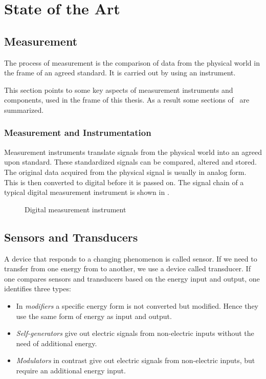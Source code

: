 \chapter{State of the Art%
  \label{chap:\currfilebase}}

\section{Measurement}
The process of measurement is the comparison of data from the physical world in the frame of an agreed standard. It is carried out by using an instrument.

This section points to some key aspects of measurement instruments and components, used in the frame of this thesis. As a result some sections of~\cite{webster2018measurement} are summarized.

\subsection{Measurement and Instrumentation}
Measurement instruments translate signals from the physical world into an agreed upon standard. These standardized signals can be compared, altered and stored.
The original data acquired from the physical signal is usually in analog form. This is then converted to digital before it is passed on. The signal chain of a typical digital measurement instrument is shown in .

\begin{figure}[!htb]
  \centering
  
  \caption[Digital Instrument]{Digital measurement instrument%
    \label{fig:digital_instrument}}
\end{figure}

\section{Sensors and Transducers}
A device that responds to a changing phenomenon is called sensor. If we need to transfer from one energy from to another, we use a device called transducer. If one compares sensors and transducers based on the energy input and output, one identifies three types:
\begin{itemize}
  \item In \emph{modifiers} a specific energy form is not converted but modified. Hence they use the same form of energy as input and output.
  \item \emph{Self-generators} give out electric signals from non-electric inputs without the need of additional energy.
  \item \emph{Modulators} in contrast give out electric signals from non-electric inputs, but require an additional energy input.
\end{itemize}

